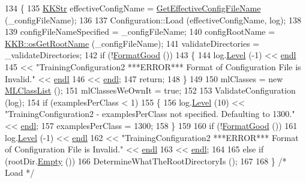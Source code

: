 \begin{DoxyCode}
134 \{
135   \hyperlink{class_k_k_b_1_1_k_k_str}{KKStr}  effectiveConfigName = \hyperlink{class_k_k_m_l_l_1_1_training_configuration2_a1805f10e0a83f752f0d501de6c11b3c3}{GetEffectiveConfigFileName} (\_configFileName);
136 
137   Configuration::Load (effectiveConfigName, log);
138 
139   configFileNameSpecified  = \_configFileName;
140   configRootName           = \hyperlink{namespace_k_k_b_af5b668ed9902d7f93b62529664a739f0}{KKB::osGetRootName} (\_configFileName);
141   validateDirectories = \_validateDirectories;
142   \textcolor{keywordflow}{if}  (!\hyperlink{class_k_k_b_1_1_configuration_a83da17732beb6179d42f73f699795b68}{FormatGood} ())
143   \{
144     log.\hyperlink{class_k_k_b_1_1_run_log_a32cf761d7f2e747465fd80533fdbb659}{Level} (-1) << \hyperlink{namespace_k_k_b_ad1f50f65af6adc8fa9e6f62d007818a8}{endl} 
145                    << \textcolor{stringliteral}{"TrainingConfiguration2   ***ERROR***  Format of Configuration File is Invalid."} << 
      \hyperlink{namespace_k_k_b_ad1f50f65af6adc8fa9e6f62d007818a8}{endl} 
146                    << \hyperlink{namespace_k_k_b_ad1f50f65af6adc8fa9e6f62d007818a8}{endl};
147     \textcolor{keywordflow}{return};
148   \}
149 
150   mlClasses = \textcolor{keyword}{new} \hyperlink{class_k_k_m_l_l_1_1_m_l_class_list}{MLClassList} ();
151   mlClassesWeOwnIt = \textcolor{keyword}{true};
152 
153  ValidateConfiguration (log);
154  \textcolor{keywordflow}{if}  (examplesPerClass < 1)
155   \{
156     log.\hyperlink{class_k_k_b_1_1_run_log_a32cf761d7f2e747465fd80533fdbb659}{Level} (10) << \textcolor{stringliteral}{"TrainingConfiguration2 - examplesPerClass not specified.  Defaulting to 1300."} 
      << \hyperlink{namespace_k_k_b_ad1f50f65af6adc8fa9e6f62d007818a8}{endl};
157     examplesPerClass = 1300;
158   \}
159 
160   \textcolor{keywordflow}{if}  (!\hyperlink{class_k_k_b_1_1_configuration_a83da17732beb6179d42f73f699795b68}{FormatGood} ())
161     log.\hyperlink{class_k_k_b_1_1_run_log_a32cf761d7f2e747465fd80533fdbb659}{Level} (-1) << \hyperlink{namespace_k_k_b_ad1f50f65af6adc8fa9e6f62d007818a8}{endl}
162                    << \textcolor{stringliteral}{"TrainingConfiguration2   ***ERROR***  Format of Configuration File is Invalid."} << 
      \hyperlink{namespace_k_k_b_ad1f50f65af6adc8fa9e6f62d007818a8}{endl}
163                    << \hyperlink{namespace_k_k_b_ad1f50f65af6adc8fa9e6f62d007818a8}{endl};
164 
165   \textcolor{keywordflow}{else} \textcolor{keywordflow}{if}  (rootDir.\hyperlink{class_k_k_b_1_1_k_k_str_ac69942f73fffd672ec2a6e1c410afdb6}{Empty} ())
166     DetermineWhatTheRootDirectoryIs ();
167 
168 \}  \textcolor{comment}{/* Load */}
\end{DoxyCode}
